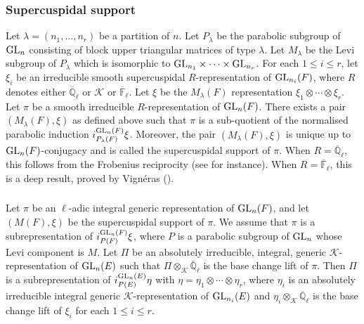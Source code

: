 \documentclass[10pt, reqno]{amsart}
\theoremstyle{plain}
\numberwithin{equation}{section} \newcommand{\di}{\operatorname{dim}}
\begin{document}
\subsubsection{Supercuspidal support}
Let $\lambda=(n_1,\dots,n_r)$ be a partition of $n$. Let $P_\lambda$
be the parabolic subgroup of ${\rm GL}_n$ consisting of block upper
triangular matrices of type $\lambda$. Let $M_\lambda$ be the Levi
subgroup of $P_\lambda$ which is isomorphic to
${\rm GL}_{n_1}\times\cdots \times {\rm GL}_{n_r}$. For each
$1\leq i\leq r$, let $\xi_i$ be an irreducible smooth supercuspidal
$R$-representation of ${\rm GL}_{n_i}(F)$, where $R$ denotes either
$\overline{\mathbb{Q}}_\ell$ or $\mathcal{K}$ or
$\overline{\mathbb{F}}_\ell$. Let $\xi$ be the $M_\lambda(F)$
representation $\xi_1\otimes\cdots\otimes\xi_r$. Let $\pi$ be a smooth
irreducible $R$-representation of ${\rm GL}_n(F)$. There exists a pair
$(M_\lambda(F),\xi)$ as defined above such that $\pi$ is a
sub-quotient of the normalised parabolic induction
$i_{P_\lambda(F)}^{{\rm GL}_n(F)}\xi$.  Moreover, the pair
$(M_\lambda(F),\xi)$ is unique up to ${\rm GL}_n(F)$-conjugacy and is
called the supercuspidal support of $\pi$.  When
$R=\overline{\mathbb{Q}}_\ell$, this follows from the Frobenius
reciprocity (see \cite{BZ_1} for instance).  When
$R=\overline{\mathbb{F}}_\ell$, this is a deep result, proved by
Vign\'eras (\cite{Vigneras_induced}).
\subsubsection{}
Let $\pi$ be an $\ell$-adic integral generic
representation of ${\rm GL}_n(F)$,
and let $(M(F),\xi)$ be the 
supercuspidal support of $\pi$. We assume that $\pi$ is a 
subrepresentation of
$i_{P(F)}^{{\rm GL}_n(F)}\xi$, where $P$ is 
a parabolic subgroup of ${\rm GL}_n$ whose 
Levi component is $M$. Let $\Pi$ be 
an absolutely irreducible,
integral, generic $\mathcal{K}$-representation 
of ${\rm GL}_n(E)$ such that
$\Pi\otimes_{\mathcal{K}}
\overline{\mathbb{Q}}_\ell$ is the base change
lift of $\pi$. Then $\Pi$ is a 
subrepresentation of
$i_{P(E)}^{{\rm GL}_n(E)}\eta$ with
$\eta = \eta_1\otimes\cdots\otimes\eta_r$, 
where $\eta_i$ is an
absolutely irreducible integral generic $\mathcal{K}$-representation
of ${\rm GL}_{n_i}(E)$ 
and
$\eta_i\otimes_{\mathcal{K}}
\overline{\mathbb{Q}}_\ell$ is the base
change lift of $\xi_i$ for each $1\leq i\leq r$.
\end{document}
